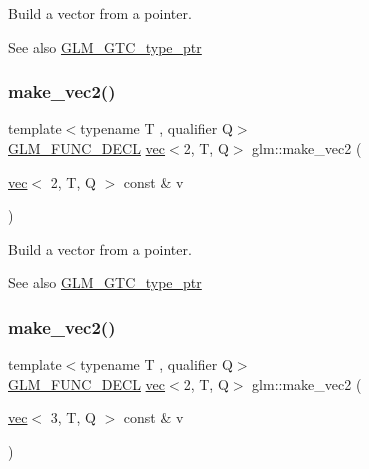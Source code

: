 Build a vector from a pointer. \begin{DoxySeeAlso}{See also}
\hyperlink{group__gtc__type__ptr}{G\+L\+M\+\_\+\+G\+T\+C\+\_\+type\+\_\+ptr} 
\end{DoxySeeAlso}
\mbox{\label{group__gtc__type__ptr_gae54bd325a08ad26edf63929201adebc7}} 
\subsubsection{\texorpdfstring{make\+\_\+vec2()}{make\_vec2()}\hspace{0.1cm}{\footnotesize\ttfamily [2/5]}}
{\footnotesize\ttfamily template$<$typename T , qualifier Q$>$ \\
\hyperlink{setup_8hpp_ab2d052de21a70539923e9bcbf6e83a51}{G\+L\+M\+\_\+\+F\+U\+N\+C\+\_\+\+D\+E\+CL} \hyperlink{structglm_1_1vec}{vec}$<$2, T, Q$>$ glm\+::make\+\_\+vec2 (\begin{DoxyParamCaption}\item[{\hyperlink{structglm_1_1vec}{vec}$<$ 2, T, Q $>$ const \&}]{v }\end{DoxyParamCaption})\hspace{0.3cm}{\ttfamily [inline]}}

Build a vector from a pointer. \begin{DoxySeeAlso}{See also}
\hyperlink{group__gtc__type__ptr}{G\+L\+M\+\_\+\+G\+T\+C\+\_\+type\+\_\+ptr} 
\end{DoxySeeAlso}
\mbox{\label{group__gtc__type__ptr_ga0084fea4694cf47276e9cccbe7b1015a}} 
\subsubsection{\texorpdfstring{make\+\_\+vec2()}{make\_vec2()}\hspace{0.1cm}{\footnotesize\ttfamily [3/5]}}
{\footnotesize\ttfamily template$<$typename T , qualifier Q$>$ \\
\hyperlink{setup_8hpp_ab2d052de21a70539923e9bcbf6e83a51}{G\+L\+M\+\_\+\+F\+U\+N\+C\+\_\+\+D\+E\+CL} \hyperlink{structglm_1_1vec}{vec}$<$2, T, Q$>$ glm\+::make\+\_\+vec2 (\begin{DoxyParamCaption}\item[{\hyperlink{structglm_1_1vec}{vec}$<$ 3, T, Q $>$ const \&}]{v }\end{DoxyParamCaption})\hspace{0.3cm}{\ttfamily [inline]}}

